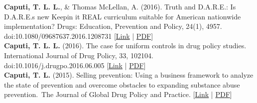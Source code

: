 \textbf{\textbf{Caputi, T. L.} L.}, & Thomas McLellan, A. (2016). Truth and D.A.R.E.: Is D.A.R.E.s new Keepin it REAL curriculum suitable for American nationwide implementation? Drugs: Education, Prevention and Policy, 24(1), 4957. doi:10.1080/09687637.2016.1208731 [\href{https://www.tandfonline.com/doi/full/10.1080/09687637.2016.1208731}{Link} | \href{https://www.theodorecaputi.com/files/DEPP-2016.pdf}{PDF}] \\[.2cm]
\textbf{\textbf{Caputi, T. L.} L.} (2016). The case for uniform controls in drug policy studies. International Journal of Drug Policy, 33, 102104. doi:10.1016/j.drugpo.2016.06.005 [\href{https://www.sciencedirect.com/science/article/abs/pii/S095539591630175X}{Link} | \href{https://www.theodorecaputi.com/files/IJDP-2016.pdf}{PDF}] \\[.2cm]
\textbf{Caputi, T. L.} (2015). Selling prevention: Using a business framework to analyze the state of prevention and overcome obstacles to expanding substance abuse prevention. The Journal of Global Drug Policy and Practice. [\href{https://www.dfaf.org/wp-content/uploads/2018/11/Vol-9-Issue-1.pdf}{Link} | \href{https://www.theodorecaputi.com/files/JGDPP-2015.pdf}{PDF}] \\[.2cm]

